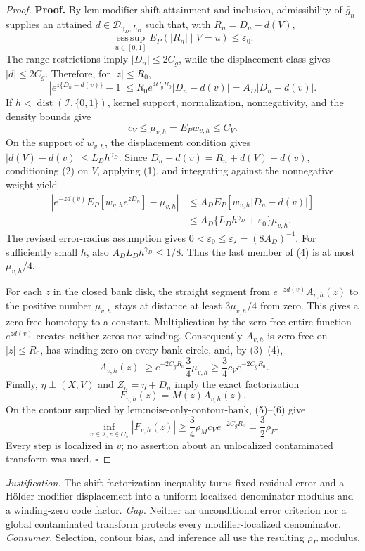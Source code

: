 \documentclass{article}
\begin{document}
\begin{proof}
\textbf{Proof.}
By \(\text{lem:modifier-shift-attainment-and-inclusion}\), admissibility of \(\bar g_n\) supplies an attained \(d\in\mathcal D_{\gamma_D,L_D}\) such that, with \(R_n=D_n-d(V)\),
\[
 \operatorname*{ess\,sup}_{u\in[0,1]}E_P(|R_n|\mid V=u)\le\varepsilon_0. \tag{1}
\]
The range restrictions imply \(|D_n|\le2C_g\), while the displacement class gives \(|d|\le2C_g\).  Therefore, for \(|z|\le R_0\),
\[
 \left|e^{z\{D_n-d(v)\}}-1\right|
 \le R_0e^{4C_gR_0}|D_n-d(v)|=A_D|D_n-d(v)|. \tag{2}
\]
If \(h<\operatorname{dist}(\mathcal I,\{0,1\})\), kernel support, normalization, nonnegativity, and the density bounds give
\[
 c_V\le\mu_{v,h}=E_Pw_{v,h}\le C_V. \tag{3}
\]
On the support of \(w_{v,h}\), the displacement condition gives \(|d(V)-d(v)|\le L_Dh^{\gamma_D}\).  Since
\(D_n-d(v)=R_n+d(V)-d(v)\), conditioning (2) on \(V\), applying (1), and integrating against the nonnegative weight yield
\[
 \begin{aligned}
 \left|e^{-zd(v)}E_P[w_{v,h}e^{zD_n}]-\mu_{v,h}\right|
 &\le A_DE_P[w_{v,h}|D_n-d(v)|]\\
 &\le A_D\{L_Dh^{\gamma_D}+\varepsilon_0\}\mu_{v,h}.
 \end{aligned} \tag{4}
\]
The revised error-radius assumption gives \(0<\varepsilon_0\le\varepsilon_\star=(8A_D)^{-1}\).  For sufficiently small \(h\), also \(A_DL_Dh^{\gamma_D}\le1/8\).  Thus the last member of (4) is at most \(\mu_{v,h}/4\).

For each \(z\) in the closed bank disk, the straight segment from \(e^{-zd(v)}A_{v,h}(z)\) to the positive number \(\mu_{v,h}\) stays at distance at least \(3\mu_{v,h}/4\) from zero.  This gives a zero-free homotopy to a constant.  Multiplication by the zero-free entire function \(e^{zd(v)}\) creates neither zeros nor winding.  Consequently \(A_{v,h}\) is zero-free on \(|z|\le R_0\), has winding zero on every bank circle, and, by (3)--(4),
\[
 |A_{v,h}(z)|
 \ge e^{-2C_gR_0}\frac34\mu_{v,h}
 \ge\frac34c_Ve^{-2C_gR_0}. \tag{5}
\]
Finally, \(\eta\perp(X,V)\) and \(Z_n=\eta+D_n\) imply the exact factorization
\[
 F_{v,h}(z)=M(z)A_{v,h}(z). \tag{6}
\]
On the contour supplied by \(\text{lem:noise-only-contour-bank}\), (5)--(6) give
\[
 \inf_{v\in\mathcal I,z\in C_\star}|F_{v,h}(z)|
 \ge\frac34\rho_Mc_Ve^{-2C_gR_0}
 =\frac32\rho_F. \tag{7}
\]
Every step is localized in \(v\); no assertion about an unlocalized contaminated transform was used. \(\square\)
\end{proof}
\par\smallskip\noindent \textit{Justification.} The shift-factorization inequality turns fixed residual error and a Hölder modifier displacement into a uniform localized denominator modulus and a winding-zero code factor. \textit{Gap.} Neither an unconditional error criterion nor a global contaminated transform protects every modifier-localized denominator. \textit{Consumer.} Selection, contour bias, and inference all use the resulting \(\rho_F\) modulus.
\end{document}
